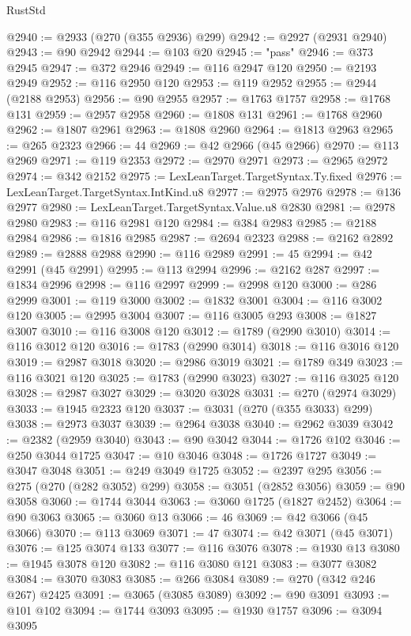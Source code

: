 \begin{lexlean}{RustStd}
\begin{coremodule}
@2940 := @2933 (@270 (@355 @2936) @299)
@2942 := @2927 (@2931 @2940)
@2943 := @90 @2942
@2944 := @103 @20
@2945 := "pass"
@2946 := @373 @2945
@2947 := @372 @2946
@2949 := @116 @2947 @120
@2950 := @2193 @2949
@2952 := @116 @2950 @120
@2953 := @119 @2952
@2955 := @2944 (@2188 @2953)
@2956 := @90 @2955
@2957 := @1763 @1757
@2958 := @1768 @131
@2959 := @2957 @2958
@2960 := @1808 @131
@2961 := @1768 @2960
@2962 := @1807 @2961
@2963 := @1808 @2960
@2964 := @1813 @2963
@2965 := @265 @2323
@2966 := 44
@2969 := @42 @2966 (@45 @2966)
@2970 := @113 @2969
@2971 := @119 @2353
@2972 := @2970 @2971
@2973 := @2965 @2972
@2974 := @342 @2152
@2975 := LexLeanTarget.TargetSyntax.Ty.fixed
@2976 := LexLeanTarget.TargetSyntax.IntKind.u8
@2977 := @2975 @2976
@2978 := @136 @2977
@2980 := LexLeanTarget.TargetSyntax.Value.u8 @2830
@2981 := @2978 @2980
@2983 := @116 @2981 @120
@2984 := @384 @2983
@2985 := @2188 @2984
@2986 := @1816 @2985
@2987 := @2694 @2323
@2988 := @2162 @2892
@2989 := @2888 @2988
@2990 := @116 @2989
@2991 := 45
@2994 := @42 @2991 (@45 @2991)
@2995 := @113 @2994
@2996 := @2162 @287
@2997 := @1834 @2996
@2998 := @116 @2997
@2999 := @2998 @120
@3000 := @286 @2999
@3001 := @119 @3000
@3002 := @1832 @3001
@3004 := @116 @3002 @120
@3005 := @2995 @3004
@3007 := @116 @3005 @293
@3008 := @1827 @3007
@3010 := @116 @3008 @120
@3012 := @1789 (@2990 @3010)
@3014 := @116 @3012 @120
@3016 := @1783 (@2990 @3014)
@3018 := @116 @3016 @120
@3019 := @2987 @3018
@3020 := @2986 @3019
@3021 := @1789 @349
@3023 := @116 @3021 @120
@3025 := @1783 (@2990 @3023)
@3027 := @116 @3025 @120
@3028 := @2987 @3027
@3029 := @3020 @3028
@3031 := @270 (@2974 @3029)
@3033 := @1945 @2323 @120
@3037 := @3031 (@270 (@355 @3033) @299)
@3038 := @2973 @3037
@3039 := @2964 @3038
@3040 := @2962 @3039
@3042 := @2382 (@2959 @3040)
@3043 := @90 @3042
@3044 := @1726 @102
@3046 := @250 @3044 @1725
@3047 := @10 @3046
@3048 := @1726 @1727
@3049 := @3047 @3048
@3051 := @249 @3049 @1725
@3052 := @2397 @295
@3056 := @275 (@270 (@282 @3052) @299)
@3058 := @3051 (@2852 @3056)
@3059 := @90 @3058
@3060 := @1744 @3044
@3063 := @3060 @1725 (@1827 @2452)
@3064 := @90 @3063
@3065 := @3060 @13
@3066 := 46
@3069 := @42 @3066 (@45 @3066)
@3070 := @113 @3069
@3071 := 47
@3074 := @42 @3071 (@45 @3071)
@3076 := @125 @3074 @133
@3077 := @116 @3076
@3078 := @1930 @13
@3080 := @1945 @3078 @120
@3082 := @116 @3080 @121
@3083 := @3077 @3082
@3084 := @3070 @3083
@3085 := @266 @3084
@3089 := @270 (@342 @246 @267) @2425
@3091 := @3065 (@3085 @3089)
@3092 := @90 @3091
@3093 := @101 @102
@3094 := @1744 @3093
@3095 := @1930 @1757
@3096 := @3094 @3095

\end{coremodule}
\end{lexlean}
